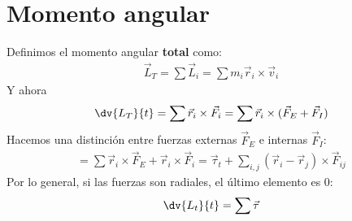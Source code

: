 \documentclass{article}
\begin{document}
\section{Momento angular}
Definimos el momento angular \textbf{total} como:
\begin{equation}
    \begin{split}
        \vec{L}_T = \sum \vec{L}_i = \sum m_{i} \vec{r}_i \times \vec{v}_i
    \end{split}
\end{equation}
Y ahora
\begin{equation}
    \begin{split}
        \dv{L_{T}}{t} = \sum \vec{r}_i \times \vec{F}_i = \sum \vec{r}_i \times
        (\vec{F}_E + \vec{F}_I)
    \end{split}
\end{equation}
Hacemos una distinción entre fuerzas externas $\vec{F}_E$ e internas $\vec{F}_I$:
\begin{equation}
    \begin{split}
        = \sum \vec{r}_i \times \vec{F}_E + \vec{r}_i \times \vec{F}_i = 
        \vec{\tau }_t + \sum _{i,j} (\vec{r}_i - \vec{r}_j) \times \vec{F}_{ij}
    \end{split}
\end{equation}
Por lo general, si las fuerzas son radiales, el último elemento es $0$:
\begin{equation}
    \begin{split}
        \dv{L_{t}}{t} = \sum  \vec{\tau }
    \end{split}
\end{equation}
\end{document}
